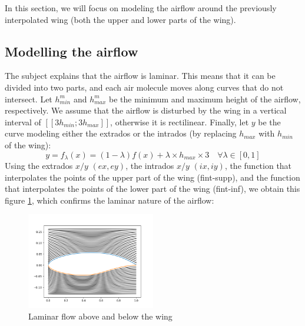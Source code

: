 In this section, we will focus on modeling the airflow around the previously interpolated wing (both the upper and lower parts of the wing).
\subsection{Modelling the airflow}
The subject explains that the airflow is laminar. This means that it can be divided into two parts, and each air molecule moves along curves that do not intersect. Let $h_{min}^{m}$ and $h_{max}^{m}$ be the minimum and maximum height of the airflow, respectively. We assume that the airflow is disturbed by the wing in a vertical interval of $[[3h_{min}; 3h_{max}]]$, otherwise it is rectilinear. Finally, let $y$ be the curve modeling either the extrados or the intrados (by replacing $h_{max}$ with $h_{min}$ of the wing):
\begin{equation}
    \label{eq:equation_part3.1}
    y = f_{\lambda}(x) = (1 - \lambda)f(x) + \lambda \times h_{max} \times 3 \quad \forall \lambda \in [0,1] 
\end{equation}
Using the extrados $x/y$ $(ex, ey)$, the intrados $x/y$ $(ix, iy)$, the function that interpolates the points of the upper part of the wing (fint-supp), and the function that interpolates the points of the lower part of the wing (fint-inf), we obtain this figure \ref{fig:laminar}, which confirms the laminar nature of the airflow:
\begin{figure}[H]
  \centering
  \includegraphics[width=0.5\textwidth]{tex/laminar_flow.png}
  \caption{Laminar flow above and below the wing}
  \label{fig:laminar}
\end{figure}
